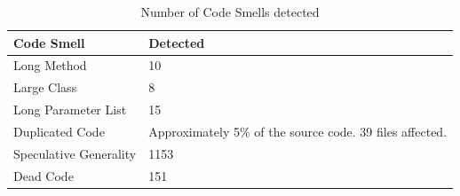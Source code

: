\begin{table}[]
\centering
\caption{Number of Code Smells detected}
\label{tab:identifiedCodeSmell}
\begin{tabular}{|l|l|}
\hline
\textbf{Code Smell}                           & \textbf{Detected}    \\ \hline
Long Method                                   & 10          \\ \hline
Large Class                                   & 8          \\ \hline
Long Parameter List                           & 15          \\ \hline
Duplicated Code                               & Approximately 5\% of the source code. 39 files affected.       \\ \hline
Speculative Generality                        & 1153      \\ \hline
Dead Code 									  & 151 \\ \hline
\end{tabular}
\end{table}

